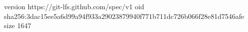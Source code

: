 version https://git-lfs.github.com/spec/v1
oid sha256:3dac15ee5a6d99a94f933a29023879940f771b711dc726b066f28e81d7546afe
size 1647

